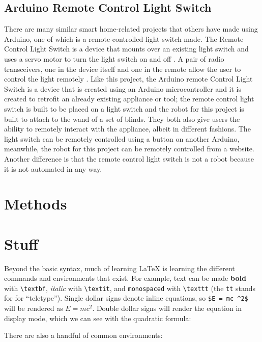 \documentclass[10pt,twocolumn]{article}
\begin{document}
\subsection{Arduino Remote Control Light Switch}
There are many similar smart home-related projects that others have made using Arduino, one of which is a remote-controlled light switch made. The Remote Control Light Switch is a device that mounts over an existing light switch and uses a servo motor to turn the light switch on and off \cite{MerrittRemoteControlLightSwitch}. A pair of radio transceivers, one in the device itself and one in the remote allow the user to control the light remotely \cite{MerrittRemoteControlLightSwitch}. Like this project, the Arduino remote Control Light Switch is a device that is created using an Arduino microcontroller and it is created to retrofit an already existing appliance or tool; the remote control light switch is built to be placed on a light switch and the robot for this project is built to attach to the wand of a set of blinds. They both also give users the ability to remotely interact with the appliance, albeit in different fashions. The light switch can be remotely controlled using a button on another Arduino, meanwhile, the robot for this project can be remotely controlled from a website. Another difference is that the remote control light switch is not a robot because it is not automated in any way.


\section{Methods}

\section{Stuff}


Beyond the basic syntax, much of learning LaTeX is learning the different commands and environments that exist.
For example, text can be made \textbf{bold} with \texttt{\textbackslash textbf}, \textit{italic} with \texttt{\textbackslash textit}, and \texttt{monospaced} with \texttt{\textbackslash texttt} (the \texttt{tt} stands for for ``teletype'').
Single dollar signs denote inline equations, so \texttt{\$E = mc \textasciicircum 2\$} will be rendered as $E = mc^2$.
Double dollar signs will render the equation in display mode, which we can see with the quadratic formula:


There are also a handful of common environments:
\end{document}
